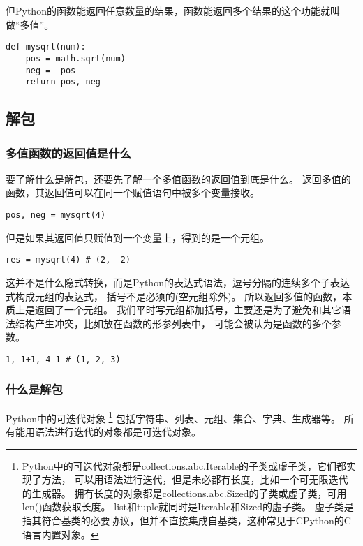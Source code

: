 \documentclass{ctexbook}
\begin{document}
但Python的函数能返回任意数量的结果，函数能返回多个结果的这个功能就叫做``多值''。

\begin{verbatim}
def mysqrt(num):
    pos = math.sqrt(num)
    neg = -pos
    return pos, neg
\end{verbatim}

\subsection{解包}

\subsubsection{多值函数的返回值是什么}

要了解什么是解包，还要先了解一个多值函数的返回值到底是什么。
返回多值的函数，其返回值可以在同一个赋值语句中被多个变量接收。

\begin{verbatim}
pos, neg = mysqrt(4)
\end{verbatim}

但是如果其返回值只赋值到一个变量上，得到的是一个元组。

\begin{verbatim}
res = mysqrt(4) # (2, -2)
\end{verbatim}

这并不是什么隐式转换，而是Python的表达式语法，逗号分隔的连续多个子表达式构成元组的表达式，
括号不是必须的{\scriptsize(空元组除外)}。
所以返回多值的函数，本质上是返回了一个元组。
我们平时写元组都加括号，主要还是为了避免和其它语法结构产生冲突，比如放在函数的形参列表中，
可能会被认为是函数的多个参数。

\begin{verbatim}
1, 1+1, 4-1 # (1, 2, 3)
\end{verbatim}

\subsubsection{什么是解包}

Python中的可迭代对象
\footnote{Python中的可迭代对象都是collections.abc.Iterable的子类或虚子类，它们都实现了方法，
可以用语法进行迭代，但是未必都有长度，比如一个可无限迭代的生成器。
拥有长度的对象都是collections.abc.Sized的子类或虚子类，可用len()函数获取长度。
list和tuple就同时是Iterable和Sized的虚子类。
虚子类是指其符合基类的必要协议，但并不直接集成自基类，这种常见于CPython的C语言内置对象。}
包括字符串、列表、元组、集合、字典、生成器等。
所有能用语法进行迭代的对象都是可迭代对象。
\end{document}
